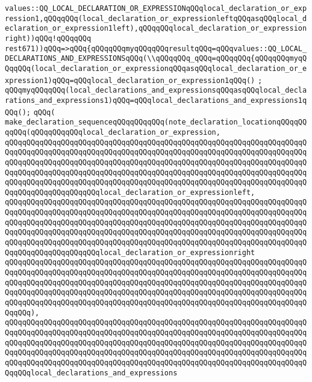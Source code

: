 \verb|values::QQ_LOCAL_DECLARATION_OR_EXPRESSIONqQQqlocal_declaration_or_expression1,qQQqqQQq(local_declaration_or_expressionleftqQQqasqQQqlocal_declaration_or_expression1left),qQQqqQQqlocal_declaration_or_expressionright))qQQq!qQQqqQQq|\newline
\verb|rest671))qQQq=>qQQq{qQQqqQQqmyqQQqqQQqresultqQQq=qQQqvalues::QQ_LOCAL_DECLARATIONS_AND_EXPRESSIONSqQQq(\\qQQqqQQq_qQQq=qQQqqQQq{qQQqqQQqmyqQQqqQQq(local_declaration_or_expressionqQQqasqQQqlocal_declaration_or_expression1)qQQq=qQQqlocal_declaration_or_expression1qQQq()|\newline
\verb|;|\newline
\verb|qQQqmyqQQqqQQq(local_declarations_and_expressionsqQQqasqQQqlocal_declarations_and_expressions1)qQQq=qQQqlocal_declarations_and_expressions1qQQq();|\newline
\verb|qQQq(|\newline
\verb|make_declaration_sequenceqQQqqQQqqQQq(note_declaration_locationqQQqqQQqqQQq(qQQqqQQqqQQqlocal_declaration_or_expression,|\newline
\verb|qQQqqQQqqQQqqQQqqQQqqQQqqQQqqQQqqQQqqQQqqQQqqQQqqQQqqQQqqQQqqQQqqQQqqQQqqQQqqQQqqQQqqQQqqQQqqQQqqQQqqQQqqQQqqQQqqQQqqQQqqQQqqQQqqQQqqQQqqQQqqQQqqQQqqQQqqQQqqQQqqQQqqQQqqQQqqQQqqQQqqQQqqQQqqQQqqQQqqQQqqQQqqQQqqQQqqQQqqQQqqQQqqQQqqQQqqQQqqQQqqQQqqQQqqQQqqQQqqQQqqQQqqQQqqQQqqQQqqQQqqQQqqQQqqQQqqQQqqQQqqQQqqQQqqQQqqQQqqQQqqQQqqQQqqQQqqQQqqQQqqQQqqQQqqQQqqQQqqQQqqQQqqQQqqQQqlocal_declaration_or_expressionleft,|\newline
\verb|qQQqqQQqqQQqqQQqqQQqqQQqqQQqqQQqqQQqqQQqqQQqqQQqqQQqqQQqqQQqqQQqqQQqqQQqqQQqqQQqqQQqqQQqqQQqqQQqqQQqqQQqqQQqqQQqqQQqqQQqqQQqqQQqqQQqqQQqqQQqqQQqqQQqqQQqqQQqqQQqqQQqqQQqqQQqqQQqqQQqqQQqqQQqqQQqqQQqqQQqqQQqqQQqqQQqqQQqqQQqqQQqqQQqqQQqqQQqqQQqqQQqqQQqqQQqqQQqqQQqqQQqqQQqqQQqqQQqqQQqqQQqqQQqqQQqqQQqqQQqqQQqqQQqqQQqqQQqqQQqqQQqqQQqqQQqqQQqqQQqqQQqqQQqqQQqqQQqqQQqqQQqqQQqqQQqlocal_declaration_or_expressionright|\newline
\verb|qQQqqQQqqQQqqQQqqQQqqQQqqQQqqQQqqQQqqQQqqQQqqQQqqQQqqQQqqQQqqQQqqQQqqQQqqQQqqQQqqQQqqQQqqQQqqQQqqQQqqQQqqQQqqQQqqQQqqQQqqQQqqQQqqQQqqQQqqQQqqQQqqQQqqQQqqQQqqQQqqQQqqQQqqQQqqQQqqQQqqQQqqQQqqQQqqQQqqQQqqQQqqQQqqQQqqQQqqQQqqQQqqQQqqQQqqQQqqQQqqQQqqQQqqQQqqQQqqQQqqQQqqQQqqQQqqQQqqQQqqQQqqQQqqQQqqQQqqQQqqQQqqQQqqQQqqQQqqQQqqQQqqQQqqQQqqQQqqQQqqQQqqQQqqQQqqQQq),|\newline
\verb|qQQqqQQqqQQqqQQqqQQqqQQqqQQqqQQqqQQqqQQqqQQqqQQqqQQqqQQqqQQqqQQqqQQqqQQqqQQqqQQqqQQqqQQqqQQqqQQqqQQqqQQqqQQqqQQqqQQqqQQqqQQqqQQqqQQqqQQqqQQqqQQqqQQqqQQqqQQqqQQqqQQqqQQqqQQqqQQqqQQqqQQqqQQqqQQqqQQqqQQqqQQqqQQqqQQqqQQqqQQqqQQqqQQqqQQqqQQqqQQqqQQqqQQqqQQqqQQqqQQqqQQqqQQqqQQqqQQqqQQqqQQqqQQqqQQqqQQqqQQqqQQqqQQqqQQqqQQqqQQqqQQqqQQqqQQqqQQqqQQqqQQqqQQqqQQqqQQqlocal_declarations_and_expressions|\newline
